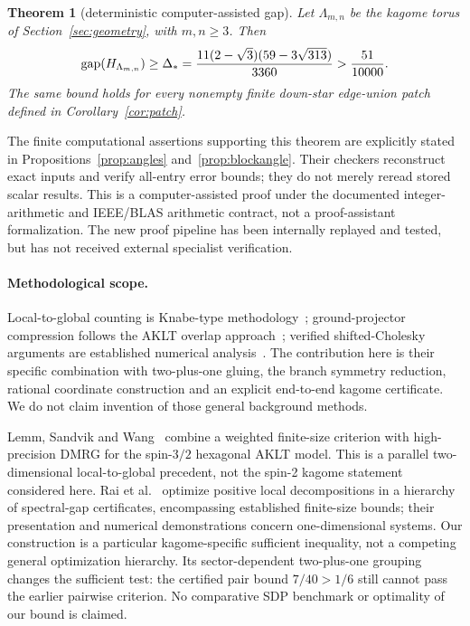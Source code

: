 \documentclass[11pt,a4paper]{article}
\newtheorem{theorem}{Theorem}[section]
\theoremstyle{remark}\newtheorem{remark}[theorem]{Remark}
\newcommand{\gap}{\operatorname{gap}}\newcommand{\ran}{\operatorname{ran}}
\begin{document}
\begin{theorem}[deterministic computer-assisted gap]\label{thm:main}
Let $\Lambda_{m,n}$ be the kagome torus of Section~\ref{sec:geometry}, with $m,n\ge3$. Then
\begin{equation}\label{eq:main}
 \gap(H_{\Lambda_{m,n}})\ge\Dstar
 =\frac{11(2-\sqrt3)(59-3\sqrt{313})}{3360}>\frac{51}{10000}.
\end{equation}
The same bound holds for every nonempty finite down-star edge-union patch defined in Corollary~\ref{cor:patch}.
\end{theorem}

The finite computational assertions supporting this theorem are explicitly stated in Propositions~\ref{prop:angles} and~\ref{prop:blockangle}. Their checkers reconstruct exact inputs and verify all-entry error bounds; they do not merely reread stored scalar results. This is a computer-assisted proof under the documented integer-arithmetic and IEEE/BLAS arithmetic contract, not a proof-assistant formalization. The new proof pipeline has been internally replayed and tested, but has not received external specialist verification.

\paragraph{Methodological scope.}
Local-to-global counting is Knabe-type methodology~\cite{Knabe}; ground-projector compression follows the AKLT overlap approach~\cite{PW,GPW}; verified shifted-Cholesky arguments are established numerical analysis~\cite{Rump}. The contribution here is their specific combination with two-plus-one gluing, the branch symmetry reduction, rational coordinate construction and an explicit end-to-end kagome certificate. We do not claim invention of those general background methods.

Lemm, Sandvik and Wang~\cite{LSW} combine a weighted finite-size criterion with high-precision DMRG for the spin-$3/2$ hexagonal AKLT model. This is a parallel two-dimensional local-to-global precedent, not the spin-2 kagome statement considered here. Rai et al.~\cite{Rai} optimize positive local decompositions in a hierarchy of spectral-gap certificates, encompassing established finite-size bounds; their presentation and numerical demonstrations concern one-dimensional systems. Our construction is a particular kagome-specific sufficient inequality, not a competing general optimization hierarchy. Its sector-dependent two-plus-one grouping changes the sufficient test: the certified pair bound $7/40>1/6$ still cannot pass the earlier pairwise criterion. No comparative SDP benchmark or optimality of our bound is claimed.
\end{document}
